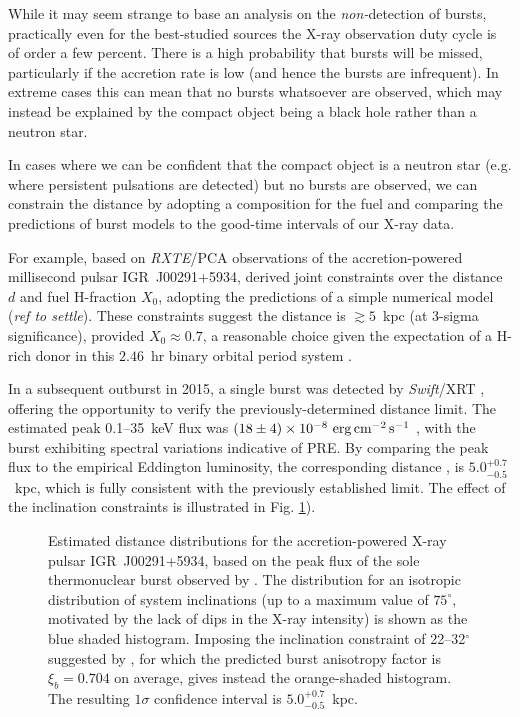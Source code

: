 \documentclass{aastex61}
\newcommand{\epcs}{{\rm erg\,cm^{-2}\,s^{-1}}}
\begin{document}
While it may seem strange to base an analysis on the {\it non-}detection of bursts, practically even for the best-studied sources the X-ray observation duty cycle is of order a few percent. There is a high probability that bursts will be missed, particularly if the accretion rate is low (and hence the bursts are infrequent). In extreme cases this can mean that no bursts whatsoever are observed, which may instead be explained by the compact object being a black hole rather than a neutron star.

In cases where we can be confident that the compact object is a neutron star (e.g. where persistent pulsations are detected) but no bursts are observed, we can constrain the distance by adopting a composition for the fuel and comparing the predictions of burst models to the good-time intervals of our X-ray data.

For example, based on {\it RXTE}/PCA observations of the accretion-powered millisecond pulsar IGR~J00291+5934, \cite{gal06b} derived joint constraints over the distance $d$ and fuel H-fraction $X_0$, adopting  the predictions of a simple numerical model ({\it ref to {\sc settle}}). These constraints suggest the distance is $\gtrsim5$~kpc (at 3-sigma significance), provided $X_0\approx0.7$, a reasonable choice given the expectation of a H-rich donor in this $2.46$~hr binary orbital period system \cite[]{gal05a}. 

In a subsequent outburst in 2015, a single burst was detected by {\it Swift}/XRT \cite[]{kuin15}, offering the opportunity to verify the previously-determined distance limit. The estimated peak 
0.1--35~keV flux was $(18\pm4)\times10^{-8}\ \epcs$ \cite[]{defalco17}, with the burst exhibiting spectral variations indicative of PRE. By comparing the peak flux to the empirical Eddington luminosity, the corresponding distance 
\cite[including the inclination range of 22--32$^\circ$ suggested by][]{torres08},
is $5.0_{-0.5}^{+0.7}$~kpc, which is fully consistent with the previously established limit. The effect of the inclination constraints is illustrated in Fig. \ref{fig:dist_igr00291}).

\begin{figure}[ht!]
\caption{Estimated distance distributions for the accretion-powered X-ray pulsar IGR~J00291+5934, based on the peak flux of the sole thermonuclear burst observed by \cite{defalco17}.
%
The distribution for an isotropic distribution of system inclinations (up to a maximum value of $75^\circ$, motivated by the lack of dips in the X-ray intensity) is shown as the blue shaded histogram. Imposing the inclination constraint of 22--32$^\circ$ suggested by \cite{torres08}, for which the predicted burst anisotropy factor is $\xi_b=0.704$ on average, gives instead the orange-shaded histogram. The resulting $1\sigma$ confidence interval is $5.0_{-0.5}^{+0.7}$~kpc.
\label{fig:dist_igr00291}}
\end{figure}
\end{document}
